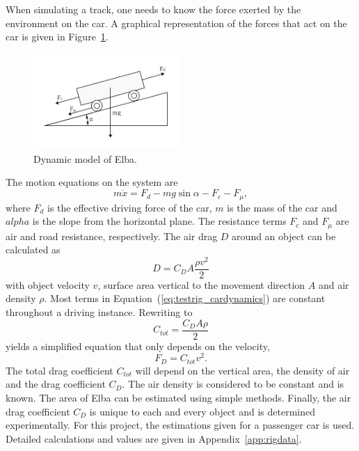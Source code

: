 When simulating a track, one needs to know the force exerted by the environment
on the car. A graphical representation of the forces that act on the car is
given in Figure~\ref{fig:testrig_elbadynamics}.
\begin{figure}[H]
    \label{fig:testrig_elbadynamics}
    \centering
    \includegraphics[width=0.5\textwidth]{./img/testrig_elbaforces.png}
    \caption{Dynamic model of Elba.}
\end{figure}
The motion equations on the system are 
\begin{equation} \label{eq:testrig_cardynamics}
    m\ddot{x} = F_d - mg\sin{\alpha} - F_c - F_{\mu},
\end{equation}
where $F_d$ is the effective driving force of the car, $m$ is the mass of the
car and $alpha$ is the slope from the horizontal plane. The resistance terms
$F_c$ and $F_{\mu}$ are air and road resistance, respectively. The air drag $D$
around an object can be calculated as \cite{nakayama2002}
\begin{equation} \label{eq:testrig_airdrag}
    D = C_D A \frac{\rho v^2} {2}
\end{equation}
with object velocity $v$, surface area vertical to the movement direction $A$
and air density $\rho$. Most terms in Equation~(\ref{eq:testrig_cardynamics})
are constant throughout a driving instance. Rewriting to
\begin{equation} \label{eq:testrig_csimple}
    C_{tot} = \frac{C_D A \rho} {2}
\end{equation}
yields a simplified equation that only depends on the velocity,
\begin{equation} \label{eq:drag}
    F_D = C_{tot}v^2.
\end{equation}
The total drag coefficient $C_{tot}$ will depend on the vertical area, the density of
air and the drag coefficient $C_D$. The air density is considered to be constant
and is known. The area of Elba can be estimated using simple methods. Finally,
the air drag coefficient $C_D$ is unique to each and every object and is
determined experimentally. For this project, the estimations given for a
passenger car is used. Detailed calculations and values are given in
Appendix~\ref{app:rigdata}. 

